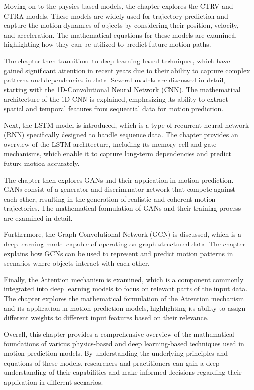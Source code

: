 Moving on to the physics-based models, the chapter explores the \ac{CTRV} and \ac{CTRA} models. These models are widely used for trajectory prediction and capture the motion dynamics of objects by considering their position, velocity, and acceleration. The mathematical equations for these models are examined, highlighting how they can be utilized to predict future motion paths.

The chapter then transitions to deep learning-based techniques, which have gained significant attention in recent years due to their ability to capture complex patterns and dependencies in data. Several models are discussed in detail, starting with the 1D-Convolutional Neural Network (CNN). The mathematical architecture of the 1D-CNN is explained, emphasizing its ability to extract spatial and temporal features from sequential data for motion prediction.

Next, the \ac{LSTM} model is introduced, which is a type of recurrent neural network (RNN) specifically designed to handle sequence data. The chapter provides an overview of the \ac{LSTM} architecture, including its memory cell and gate mechanisms, which enable it to capture long-term dependencies and predict future motion accurately.

The chapter then explores \acp{GAN} and their application in motion prediction. \acp{GAN} consist of a generator and discriminator network that compete against each other, resulting in the generation of realistic and coherent motion trajectories. The mathematical formulation of \acp{GAN} and their training process are examined in detail.

Furthermore, the Graph Convolutional Network (GCN) is discussed, which is a deep learning model capable of operating on graph-structured data. The chapter explains how GCNs can be used to represent and predict motion patterns in scenarios where objects interact with each other.

Finally, the Attention mechanism is examined, which is a component commonly integrated into deep learning models to focus on relevant parts of the input data. The chapter explores the mathematical formulation of the Attention mechanism and its application in motion prediction models, highlighting its ability to assign different weights to different input features based on their relevance.

Overall, this chapter provides a comprehensive overview of the mathematical foundations of various physics-based and deep learning-based techniques used in motion prediction models. By understanding the underlying principles and equations of these models, researchers and practitioners can gain a deep understanding of their capabilities and make informed decisions regarding their application in different scenarios.